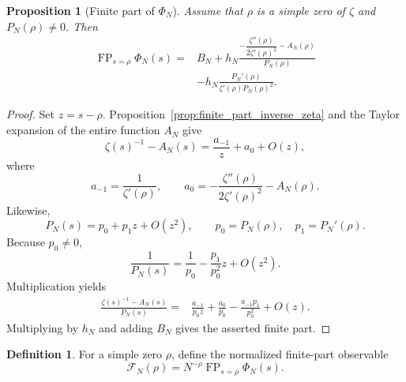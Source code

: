 \documentclass[11pt]{amsart}
\numberwithin{equation}{section}
\theoremstyle{plain}
\newtheorem{proposition}[theorem]{Proposition}
\theoremstyle{definition}
\newtheorem{definition}[theorem]{Definition}
\theoremstyle{remark}
\DeclareMathOperator{\FP}{FP}
\newcommand{\1}{\mathbf{1}}
\begin{document}
\begin{proposition}[Finite part of \(\Phi_N\)]
\label{prop:finite_part_Phi}
Assume that \(\rho\) is a simple zero of \(\zeta\) and
\(P_N(\rho)\neq0\).  Then
\begin{align}
\FP_{s=\rho}\Phi_N(s)
={}&
B_N
+
h_N
\frac{
-\dfrac{\zeta''(\rho)}{2\zeta'(\rho)^2}
-A_N(\rho)
}{
P_N(\rho)
}
\label{eq:Phi_finite_part_first}
\\
&-
h_N
\frac{P_N'(\rho)}
{\zeta'(\rho)P_N(\rho)^2}.
\label{eq:Phi_finite_part_second}
\end{align}
\end{proposition}

\begin{proof}
Set \(z=s-\rho\).  Proposition~\ref{prop:finite_part_inverse_zeta} and
the Taylor expansion of the entire function \(A_N\) give
\begin{equation}
\zeta(s)^{-1}-A_N(s)
=
\frac{a_{-1}}{z}+a_0+O(z),
\label{eq:Phi_fp_numerator_detailed}
\end{equation}
where
\begin{equation}
a_{-1}=\frac1{\zeta'(\rho)},
\qquad
a_0=-\frac{\zeta''(\rho)}{2\zeta'(\rho)^2}-A_N(\rho).
\label{eq:Phi_fp_a_coefficients}
\end{equation}
Likewise,
\begin{equation}
P_N(s)
=
p_0+p_1z+O(z^2),
\qquad
p_0=P_N(\rho),\quad p_1=P_N'(\rho).
\label{eq:Phi_fp_denominator_detailed}
\end{equation}
Because \(p_0\neq0\),
\begin{equation}
\frac1{P_N(s)}
=
\frac1{p_0}-\frac{p_1}{p_0^2}z+O(z^2).
\label{eq:Phi_fp_inverse_denominator}
\end{equation}
Multiplication yields
\begin{align}
\frac{\zeta(s)^{-1}-A_N(s)}{P_N(s)}
={}&
\frac{a_{-1}}{p_0z}
+
\frac{a_0}{p_0}
-
\frac{a_{-1}p_1}{p_0^2}
+O(z).
\label{eq:Phi_fp_quotient_detailed}
\end{align}
Multiplying by \(h_N\) and adding \(B_N\) gives the asserted finite part.
\end{proof}

\begin{definition}
\label{def:finite_part_scale}
For a simple zero \(\rho\), define the normalized finite-part observable
\begin{equation}
\mathcal F_N(\rho)
=
N^{-\rho}\FP_{s=\rho}\Phi_N(s).
\label{eq:finite_part_scale}
\end{equation}
\end{definition}
\end{document}
